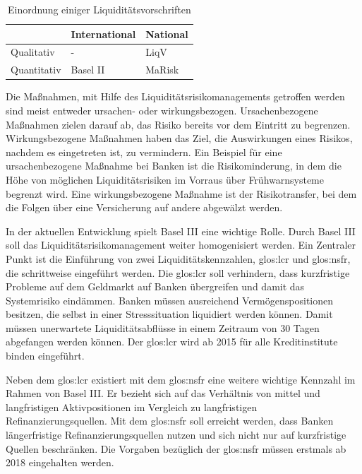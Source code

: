 {
\setlength{\extrarowheight}{2pt}
\begin{table}[htbp]
\centering
\begin{tabular}{| l | >{\centering\arraybackslash} m{4cm} | >{\centering\arraybackslash} m{4cm} |}
\cline{2-3}
\multicolumn{1}{l|}{}	& International & National 		\\	\hline
Qualitativ 				& - 			& \gls{LiqV}	\\	\hline
Quantitativ 			& Basel II 		& \gls{MaRisk}	\\	\hline
\end{tabular} 
\caption{Einordnung einiger Liquiditätsvorschriften \label{table:einordnung}}
\end{table}
}

Die Maßnahmen, mit Hilfe des Liquiditätsrisikomanagements getroffen werden sind meist entweder ursachen- oder wirkungsbezogen. Ursachenbezogene Maßnahmen zielen darauf ab, das Risiko bereits vor dem Eintritt zu begrenzen. Wirkungsbezogene Maßnahmen haben das Ziel, die Auswirkungen eines Risikos, nachdem es eingetreten ist, zu vermindern. Ein Beispiel für eine ursachenbezogene Maßnahme bei Banken ist die Risikominderung, in dem die Höhe von möglichen Liquiditätsrisiken im Vorraus über Frühwarnsysteme begrenzt wird. Eine wirkungsbezogene Maßnahme ist der Risikotransfer, bei dem die Folgen über eine Versicherung auf andere abgewälzt werden.

In der aktuellen Entwicklung spielt Basel III eine wichtige Rolle. Durch Basel III soll das Liquiditätsrisikomanagement weiter homogenisiert werden. Ein Zentraler Punkt ist die Einführung von zwei Liquiditätskennzahlen, \gls{glos:lcr} und \gls{glos:nsfr}, die schrittweise eingeführt werden. Die \gls{glos:lcr} soll verhindern, dass kurzfristige Probleme auf dem Geldmarkt auf Banken übergreifen und damit das Systemrisiko eindämmen. Banken müssen ausreichend Vermögenspositionen besitzen, die selbst in einer Stresssituation liquidiert werden können. Damit müssen unerwartete Liquiditätsabflüsse in einem Zeitraum von 30 Tagen abgefangen werden können. Der \gls{glos:lcr} wird ab 2015 für alle Kreditinstitute binden eingeführt.

Neben dem \gls{glos:lcr} existiert mit dem \gls{glos:nsfr} eine weitere wichtige Kennzahl im Rahmen von Basel III. Er bezieht sich auf das Verhältnis von mittel und langfristigen Aktivpositionen im Vergleich zu langfristigen Refinanzierungsquellen. Mit dem \gls{glos:nsfr} soll erreicht werden, dass Banken längerfristige Refinanzierungsquellen nutzen und sich nicht nur auf kurzfristige Quellen beschränken. Die Vorgaben bezüglich der \gls{glos:nsfr} müssen erstmals ab 2018 eingehalten werden.

